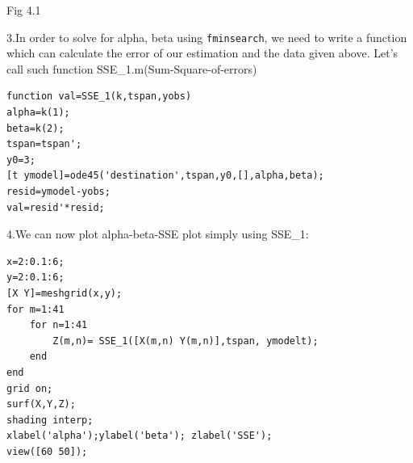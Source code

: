 \documentclass[a4paper]{article}
\begin{document}
Fig 4.1

3.In order to solve for alpha, beta using \verb$fminsearch$, we need to write a function which can calculate the error of our estimation and the data given above. Let’s call such function SSE\_1.m(Sum-Square-of-errors)
\begin{verbatim}
function val=SSE_1(k,tspan,yobs)
alpha=k(1);
beta=k(2);
tspan=tspan';
y0=3;
[t ymodel]=ode45('destination',tspan,y0,[],alpha,beta);
resid=ymodel-yobs;
val=resid'*resid;
\end{verbatim}

4.We can now plot alpha-beta-SSE plot simply using SSE\_1:
\begin{verbatim}
x=2:0.1:6;
y=2:0.1:6;
[X Y]=meshgrid(x,y);
for m=1:41
    for n=1:41
        Z(m,n)= SSE_1([X(m,n) Y(m,n)],tspan, ymodelt);
    end
end
grid on;
surf(X,Y,Z);
shading interp;
xlabel('alpha');ylabel('beta'); zlabel('SSE');
view([60 50]);
\end{verbatim}
\end{document}
